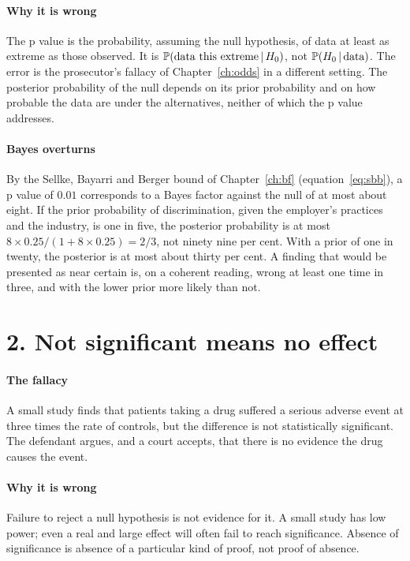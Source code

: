 \paragraph{Why it is wrong} The p value is the probability, assuming the null hypothesis, of data at least as extreme as those observed. It is $\mathbb{P}(\text{data this extreme}\,\vert\, H_0)$, not $\mathbb{P}(H_0\,\vert\,\text{data})$. The error is the prosecutor's fallacy of Chapter~\ref{ch:odds} in a different setting. The posterior probability of the null depends on its prior probability and on how probable the data are under the alternatives, neither of which the p value addresses.

\paragraph{Bayes overturns} By the Sellke, Bayarri and Berger bound \citep{sellke2001} of Chapter~\ref{ch:bf} (equation~\eqref{eq:sbb}), a p value of $0.01$ corresponds to a Bayes factor against the null of at most about eight. If the prior probability of discrimination, given the employer's practices and the industry, is one in five, the posterior probability is at most $8\times 0.25/(1 + 8\times 0.25) = 2/3$, not ninety nine per cent. With a prior of one in twenty, the posterior is at most about thirty per cent. A finding that would be presented as near certain is, on a coherent reading, wrong at least one time in three, and with the lower prior more likely than not.

\section{2. Not significant means no effect}

\paragraph{The fallacy} A small study finds that patients taking a drug suffered a serious adverse event at three times the rate of controls, but the difference is not statistically significant. The defendant argues, and a court accepts, that there is no evidence the drug causes the event.

\paragraph{Why it is wrong} Failure to reject a null hypothesis is not evidence for it. A small study has low power; even a real and large effect will often fail to reach significance. Absence of significance is absence of a particular kind of proof, not proof of absence.

